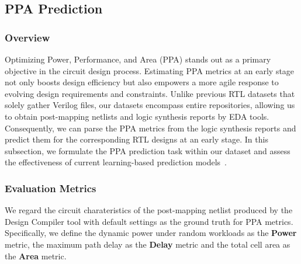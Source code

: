 


\subsection{PPA Prediction}
\label{sec:PPA}
\subsubsection{Overview}
Optimizing Power, Performance, and Area (PPA) stands out as a primary objective in the circuit design process. Estimating PPA metrics at an early stage not only boosts design efficiency but also empowers a more agile response to evolving design requirements and constraints. Unlike previous RTL datasets that solely gather Verilog files, our datasets encompass entire repositories, allowing us to obtain post-mapping netlists and logic synthesis reports by EDA tools. Consequently, we can parse the PPA metrics from the logic synthesis reports and predict them for the corresponding RTL designs at an early stage. In this subsection, we formulate the PPA prediction task within our dataset and assess the effectiveness of current learning-based prediction models~\cite{xu2022sns, sengupta2022good, fang2023masterrtl}. 

\subsubsection{Evaluation Metrics}
We regard the circuit charateristics of the post-mapping netlist produced by the Design Compiler tool with default settings as the ground truth for PPA metrics. Specifically, we define the dynamic power under random workloads as the \textbf{Power} metric, the maximum path delay as the \textbf{Delay} metric and the total cell area as the \textbf{Area} metric. 


